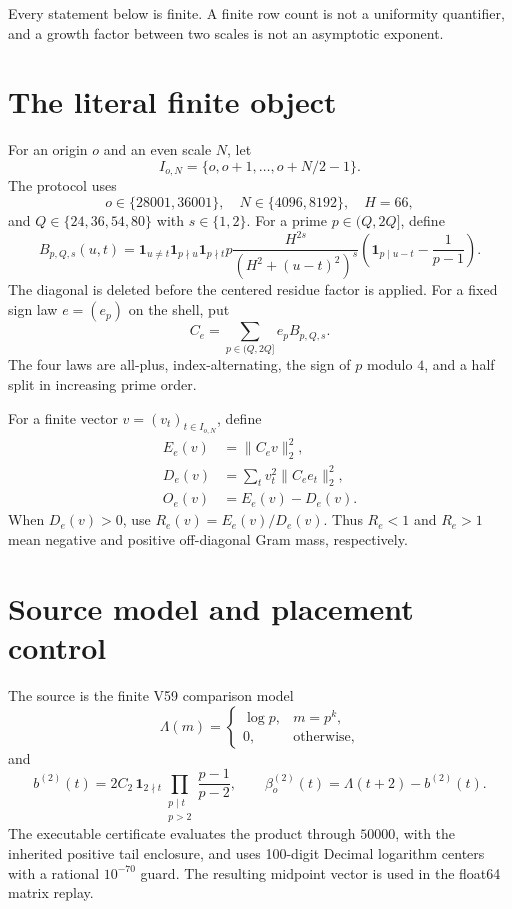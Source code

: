 \documentclass[10pt]{article}
\newcommand{\1}{\mathbf 1}
\begin{document}
Every statement below is finite.  A finite row count is not a uniformity
quantifier, and a growth factor between two scales is not an asymptotic
exponent.

\section{The literal finite object}

For an origin $o$ and an even scale $N$, let
\[
 I_{o,N}=\{o,o+1,\ldots,o+N/2-1\}.
\]
The protocol uses
\[
 o\in\{28001,36001\},\quad N\in\{4096,8192\},\quad H=66,
\]
and $Q\in\{24,36,54,80\}$ with $s\in\{1,2\}$.  For a prime
$p\in(Q,2Q]$, define
\begin{equation}\label{eq:block}
 B_{p,Q,s}(u,t)=
 \1_{u\ne t}\1_{p\nmid u}\1_{p\nmid t}
 p\frac{H^{2s}}{(H^2+(u-t)^2)^s}
 \left(\1_{p\mid u-t}-\frac1{p-1}\right).
\end{equation}
The diagonal is deleted before the centered residue factor is applied.  For a
fixed sign law $e=(e_p)$ on the shell, put
\[
 C_e=\sum_{p\in(Q,2Q]}e_pB_{p,Q,s}.
\]
The four laws are all-plus, index-alternating, the sign of $p$ modulo $4$,
and a half split in increasing prime order.

For a finite vector $v=(v_t)_{t\in I_{o,N}}$, define
\begin{align}
 E_e(v)&=\|C_ev\|_2^2,\\
 D_e(v)&=\sum_t v_t^2\|C_ee_t\|_2^2,\\
 O_e(v)&=E_e(v)-D_e(v).
\end{align}
When $D_e(v)>0$, use $R_e(v)=E_e(v)/D_e(v)$.  Thus $R_e<1$ and
$R_e>1$ mean negative and positive off-diagonal Gram mass, respectively.

\section{Source model and placement control}

The source is the finite V59 comparison model
\[
 \Lambda(m)=
 \begin{cases}
   \log p,&m=p^k,\\
   0,&\text{otherwise},
 \end{cases}
\]
and
\begin{equation}\label{eq:comparison}
 b^{(2)}(t)=2C_2\,\1_{2\nmid t}
 \prod_{\substack{p\mid t\\p>2}}\frac{p-1}{p-2},\qquad
 \beta_o^{(2)}(t)=\Lambda(t+2)-b^{(2)}(t).
\end{equation}
The executable certificate evaluates the product through $50000$, with the
inherited positive tail enclosure, and uses 100-digit Decimal logarithm
centers with a rational $10^{-70}$ guard.  The resulting midpoint vector is
used in the float64 matrix replay.
\end{document}

